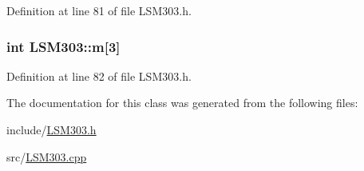 \-Definition at line 81 of file \-L\-S\-M303.\-h.

\hypertarget{class_l_s_m303_a606cb6a86d385c4c4a9767f6b1bf2ea5}{
\subsubsection[{m}]{\setlength{\rightskip}{0pt plus 5cm}int {\bf \-L\-S\-M303\-::m}\mbox{[}3\mbox{]}}}\label{class_l_s_m303_a606cb6a86d385c4c4a9767f6b1bf2ea5}


\-Definition at line 82 of file \-L\-S\-M303.\-h.



\-The documentation for this class was generated from the following files\-:\begin{DoxyCompactItemize}
\item 
include/\hyperlink{_l_s_m303_8h}{\-L\-S\-M303.\-h}\item 
src/\hyperlink{_l_s_m303_8cpp}{\-L\-S\-M303.\-cpp}\end{DoxyCompactItemize}
